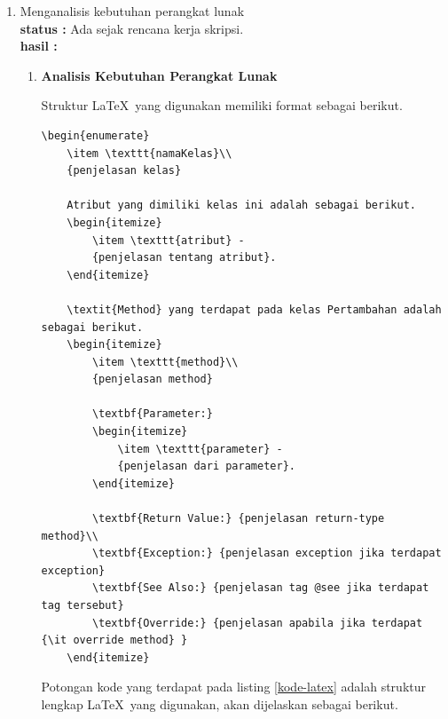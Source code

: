 \documentclass[a4paper,twoside]{article}
\begin{document}
\begin{enumerate}
		\item Menganalisis kebutuhan perangkat lunak\\
		{\bf status :} Ada sejak rencana kerja skripsi.\\
		{\bf hasil :} 
		\begin{enumerate}
			\item \textbf{Analisis Kebutuhan Perangkat Lunak}
\label{sec:analisis}

Struktur \LaTeX\ yang digunakan memiliki format sebagai berikut.
\begin{lstlisting}[caption=Potongan kode \LaTeX, label={kode-latex}]
	\begin{enumerate}
	\item \texttt{namaKelas}\\
	{penjelasan kelas}
	
	Atribut yang dimiliki kelas ini adalah sebagai berikut.
	\begin{itemize}
		\item \texttt{atribut} -
		{penjelasan tentang atribut}.
	\end{itemize}
	
	\textit{Method} yang terdapat pada kelas Pertambahan adalah sebagai berikut.
	\begin{itemize}
		\item \texttt{method}\\
		{penjelasan method}
		
		\textbf{Parameter:}
		\begin{itemize}
			\item \texttt{parameter} - 
			{penjelasan dari parameter}.
		\end{itemize}
		
		\textbf{Return Value:} {penjelasan return-type method}\\
		\textbf{Exception:} {penjelasan exception jika terdapat exception}
		\textbf{See Also:} {penjelasan tag @see jika terdapat tag tersebut}
		\textbf{Override:} {penjelasan apabila jika terdapat {\it override method} }
	\end{itemize}

\end{lstlisting}

Potongan kode yang terdapat pada listing \ref{kode-latex} adalah struktur lengkap \LaTeX\ yang digunakan, akan dijelaskan sebagai berikut.


\end{enumerate}
\end{enumerate}
\end{document}
